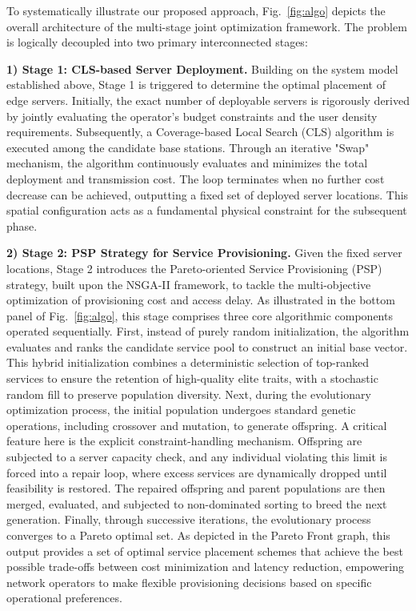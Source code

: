 \documentclass[10pt, conference, letterpaper]{IEEEtran}
\begin{document}
To systematically illustrate our proposed approach, Fig.~\ref{fig:algo} depicts the overall architecture of the multi-stage joint optimization framework. The problem is logically decoupled into two primary interconnected stages:

\textbf{1) Stage 1: CLS-based Server Deployment.} 
 Building on the system model established above, Stage 1 is triggered to determine the optimal placement of edge servers.
  Initially, the exact number of deployable servers is rigorously derived by jointly evaluating the operator's budget
  constraints and the user density requirements. Subsequently, a Coverage-based Local Search (CLS) algorithm is executed
  among the candidate base stations. Through an iterative "Swap" mechanism, the algorithm continuously evaluates and
  minimizes the total deployment and transmission cost. The loop terminates when no further cost decrease can be achieved,
  outputting a fixed set of deployed server locations. This spatial configuration acts as a fundamental physical constraint
  for the subsequent phase.

\textbf{2) Stage 2: PSP Strategy for Service Provisioning.} 
Given the fixed server locations, Stage 2 introduces the Pareto-oriented Service Provisioning (PSP) strategy, built upon the NSGA-II framework, to tackle the multi-objective optimization of provisioning cost and access delay. As illustrated in the bottom panel of Fig.~\ref{fig:algo}, this stage comprises three core algorithmic components operated sequentially. First, instead of purely random initialization, the algorithm evaluates and ranks the candidate service pool to construct an initial base vector. This hybrid initialization combines a deterministic selection of top-ranked services to ensure the retention of high-quality elite traits, with a stochastic random fill to preserve population diversity. Next, during the evolutionary optimization process, the initial population undergoes standard genetic operations, including crossover and mutation, to generate offspring. A critical feature here is the explicit constraint-handling mechanism. Offspring are subjected to a server capacity check, and any individual violating this limit is forced into a repair loop, where excess services are dynamically dropped until feasibility is restored. The repaired offspring and parent populations are then merged, evaluated, and subjected to non-dominated sorting to breed the next generation. Finally, through successive iterations, the evolutionary process converges to a Pareto optimal set. As depicted in the Pareto Front graph, this output provides a set of optimal service placement schemes that achieve the best possible trade-offs between cost minimization and latency reduction, empowering network operators to make flexible provisioning decisions based on specific operational preferences.
\end{document}

